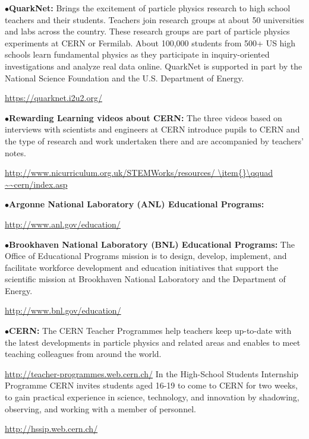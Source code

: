 \smallskip

\item{$\bullet$}{\bf QuarkNet:} 
Brings the excitement of particle physics research to high school teachers and their students. Teachers join research groups at about 50 universities and labs across the country. These research groups are part of particle physics experiments at CERN or Fermilab. About 100,000 students from 500+ US high schools learn fundamental physics as they participate in inquiry-oriented investigations and analyze real data online. QuarkNet is supported in part by the National Science Foundation and the U.S. Department of Energy.
	\item{}\qquad\url{https://quarknet.i2u2.org/}

\medskip

\item{$\bullet$}{\bf Rewarding Learning videos about CERN:}
The three videos based on interviews with scientists and engineers at CERN introduce pupils to CERN and the type of research and work undertaken there and are accompanied by teachers' notes.
	\item{}\qquad\url{http://www.nicurriculum.org.uk/STEMWorks/resources/
        \item{}\qquad ~~cern/index.asp}


\medskip
\medskip


\smallskip

\item{$\bullet$}{\bf Argonne National Laboratory (ANL) Educational Programs:}
	\item{}\qquad\url{http://www.anl.gov/education/}

\smallskip

\item{$\bullet$}{\bf Brookhaven National Laboratory (BNL) Educational Programs:}
The Office of Educational Programs mission is to design, develop, implement, and facilitate workforce development and education initiatives that support the scientific mission at Brookhaven National Laboratory and the Department of Energy.
	\item{}\qquad\url{http://www.bnl.gov/education/}

\smallskip

\item{$\bullet$}{\bf CERN:} 
The CERN Teacher Programmes help teachers keep up-to-date with the latest developments in particle physics and related areas and enables to meet teaching colleagues from around the world.
	\item{}\qquad\url{http://teacher-programmes.web.cern.ch/}
In the High-School Students Internship Programme CERN invites students aged 16-19 to come to CERN for two weeks, to gain practical experience in science, technology, and innovation by shadowing, observing, and working with a member of personnel.
	\item{}\qquad\url{http://hssip.web.cern.ch/}

